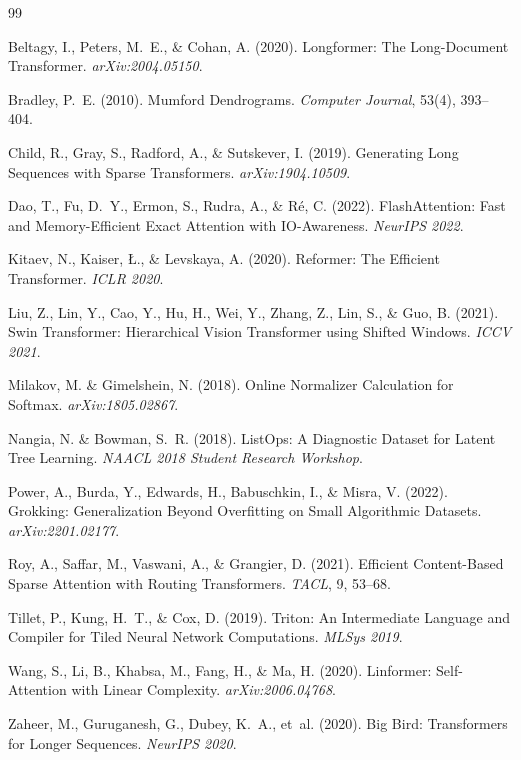 \documentclass[11pt,a4paper]{article}
\begin{document}
\begin{thebibliography}{99}

Beltagy, I., Peters, M.~E., \& Cohan, A. (2020).
\newblock Longformer: The Long-Document Transformer.
\newblock \emph{arXiv:2004.05150}.

Bradley, P.~E. (2010).
\newblock Mumford Dendrograms.
\newblock \emph{Computer Journal}, 53(4), 393--404.

Child, R., Gray, S., Radford, A., \& Sutskever, I. (2019).
\newblock Generating Long Sequences with Sparse Transformers.
\newblock \emph{arXiv:1904.10509}.

Dao, T., Fu, D.~Y., Ermon, S., Rudra, A., \& R\'{e}, C. (2022).
\newblock FlashAttention: Fast and Memory-Efficient Exact Attention with IO-Awareness.
\newblock \emph{NeurIPS 2022}.

Kitaev, N., Kaiser, {\L}., \& Levskaya, A. (2020).
\newblock Reformer: The Efficient Transformer.
\newblock \emph{ICLR 2020}.

Liu, Z., Lin, Y., Cao, Y., Hu, H., Wei, Y., Zhang, Z., Lin, S., \& Guo, B. (2021).
\newblock Swin Transformer: Hierarchical Vision Transformer using Shifted Windows.
\newblock \emph{ICCV 2021}.

Milakov, M. \& Gimelshein, N. (2018).
\newblock Online Normalizer Calculation for Softmax.
\newblock \emph{arXiv:1805.02867}.

Nangia, N. \& Bowman, S.~R. (2018).
\newblock ListOps: A Diagnostic Dataset for Latent Tree Learning.
\newblock \emph{NAACL 2018 Student Research Workshop}.

Power, A., Burda, Y., Edwards, H., Babuschkin, I., \& Misra, V. (2022).
\newblock Grokking: Generalization Beyond Overfitting on Small Algorithmic Datasets.
\newblock \emph{arXiv:2201.02177}.

Roy, A., Saffar, M., Vaswani, A., \& Grangier, D. (2021).
\newblock Efficient Content-Based Sparse Attention with Routing Transformers.
\newblock \emph{TACL}, 9, 53--68.

Tillet, P., Kung, H.~T., \& Cox, D. (2019).
\newblock Triton: An Intermediate Language and Compiler for Tiled Neural Network Computations.
\newblock \emph{MLSys 2019}.

Wang, S., Li, B., Khabsa, M., Fang, H., \& Ma, H. (2020).
\newblock Linformer: Self-Attention with Linear Complexity.
\newblock \emph{arXiv:2006.04768}.

Zaheer, M., Guruganesh, G., Dubey, K.~A., et~al. (2020).
\newblock Big Bird: Transformers for Longer Sequences.
\newblock \emph{NeurIPS 2020}.

\end{thebibliography}
\end{document}
